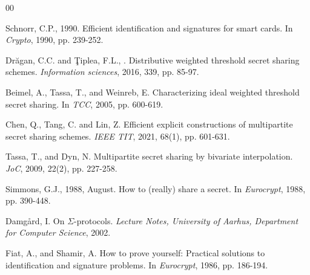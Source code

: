 \documentclass[runningheads]{llncs}
\begin{document}
\begin{thebibliography}{00}




Schnorr, C.P., 1990. Efficient identification and signatures for smart cards. In \textit{Crypto}, 1990, pp. 239-252.






Drăgan, C.C. and Ţiplea, F.L., . Distributive weighted threshold secret sharing schemes. \textit{Information sciences}, 2016, 339, pp. 85-97.

 Beimel, A., Tassa, T., and Weinreb, E. Characterizing ideal weighted threshold secret sharing. In \textit{TCC}, 2005, pp. 600-619.

Chen, Q., Tang, C. and Lin, Z. Efficient explicit constructions of multipartite secret sharing schemes. \textit{IEEE TIT}, 2021, 68(1), pp. 601-631.

 Tassa, T., and Dyn, N. Multipartite secret sharing by bivariate interpolation. \textit{JoC}, 2009, 22(2), pp. 227-258.


Simmons, G.J., 1988, August. How to (really) share a secret. In \textit{Eurocrypt}, 1988, pp. 390-448.

 Damg{\aa}rd, I. On $\Sigma$-protocols. \textit{Lecture Notes, University of Aarhus, Department for Computer Science}, 2002.

 Fiat, A., and Shamir, A. How to prove yourself: Practical solutions to identification and signature problems. In \textit{Eurocrypt}, 1986, pp. 186-194.






\end{thebibliography}
\end{document}
